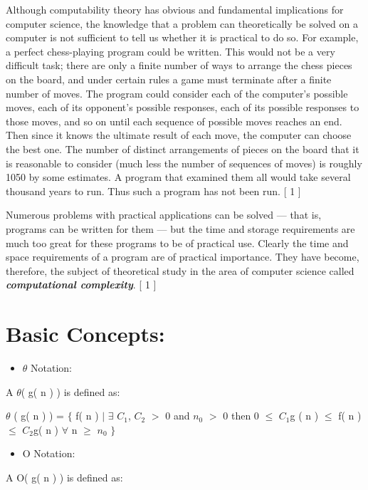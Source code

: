 \documentclass[10pt,a4paper]{article}
\begin{document}
Although computability theory has obvious and fundamental implications for computer
science, the knowledge that a problem can theoretically be solved on a computer is not
sufficient to tell us whether it is practical to do so. For example, a perfect chess-playing
program could be written. This would not be a very difficult task; there are only a finite
number of ways to arrange the chess pieces on the board, and under certain rules a game
must terminate after a finite number of moves. The program could consider each of the
computer’s possible moves, each of its opponent’s possible responses, each of its possible
responses to those moves, and so on until each sequence of possible moves reaches an end.
Then since it knows the ultimate result of each move, the computer can choose the best
one. The number of distinct arrangements of pieces on the board that it is reasonable to
consider (much less the number of sequences of moves) is roughly 1050 by some estimates.
A program that examined them all would take several thousand years to run. Thus such a
program has not been run. [ 1 ] \hfill \break

Numerous problems with practical applications can be solved — that is, programs can
be written for them — but the time and storage requirements are much too great for these
programs to be of practical use. Clearly the time and space requirements of a program are
of practical importance. They have become, therefore, the subject of theoretical study in
the area of computer science called {\bfseries\itshape computational complexity}. [ 1 ]

\pagebreak

\section{Basic Concepts:}

\begin{itemize}
\item $\theta$ Notation:
\end{itemize} 
A $\theta$( g( n ) )  is defined as: \hfill \break

$\theta$ ( g( n ) ) = $\lbrace$ f( n ) $\mid$ $\exists$ $C_{1}$, $C_{2}$ $>$ 0 and $n_{0}$ $>$ 0 then 0 $\leq$ $C_{1}$g ( n ) $\leq$ f( n ) $\leq$ $C_{2}$g( n ) $\forall$ n $\geq$ $n_{0}$ $\rbrace$ \hfill \break

\begin{itemize}
\item O Notation:
\end{itemize} 
A O( g( n ) )  is defined as: \hfill \break
\end{document}
